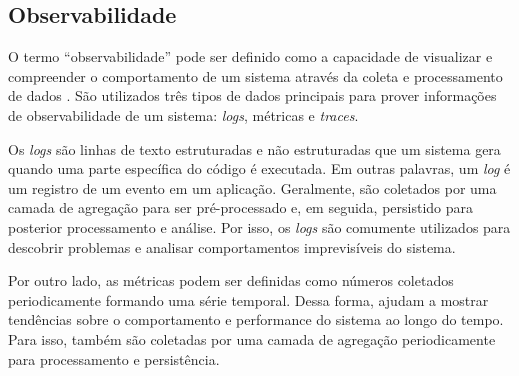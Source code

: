 

\subsection{Observabilidade}
\label{sec:observabilidade}

O termo ``observabilidade'' pode ser definido como a capacidade de visualizar e compreender o comportamento de um sistema através da coleta e processamento de dados \cite{picoreti2018observability}. São utilizados três tipos de dados principais para prover informações de observabilidade de um sistema: \textit{logs}, métricas e \textit{traces}.

Os \textit{logs} são linhas de texto estruturadas e não estruturadas que um sistema gera quando uma parte específica do código é executada. Em outras palavras, um \textit{log} é um registro de um evento em um aplicação. Geralmente, são coletados por uma camada de agregação para ser pré-processado e, em seguida, persistido para posterior processamento e análise. Por isso, os \textit{logs} são comumente utilizados para descobrir problemas e analisar comportamentos imprevisíveis do sistema.

Por outro lado, as métricas podem ser definidas como números coletados periodicamente formando uma série temporal. Dessa forma, ajudam a mostrar tendências sobre o comportamento e performance do sistema ao longo do tempo. Para isso, também são coletadas por uma camada de agregação periodicamente para processamento e persistência.

